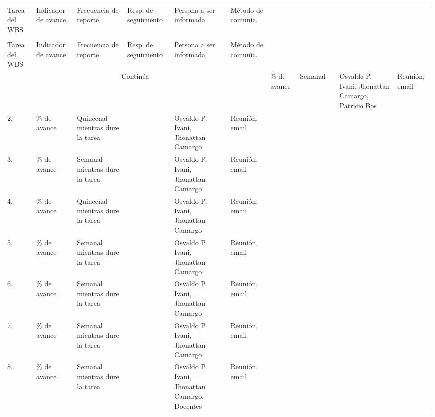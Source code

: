 \documentclass[11pt]{charter}
\begin{document}
\begin{longtable}{|m{1cm}|m{3.5cm}|m{2.2cm}|m{2cm}|m{3cm}|m{1.5cm}|}
\hline
\rowcolor[HTML]{C0C0C0} 
\multicolumn{6}{|c|}{\cellcolor[HTML]{C0C0C0}SEGUIMIENTO DE AVANCE}                                                                       \\ \hline
\rowcolor[HTML]{C0C0C0} 
Tarea del WBS 			& Indicador de avance & Frecuencia de reporte & Resp. de seguimiento & Persona a ser informada & Método de comunic. \\ \hline
\endfirsthead

\hline
\rowcolor[HTML]{C0C0C0} 
\multicolumn{6}{c}{\cellcolor[HTML]{C0C0C0}SEGUIMIENTO DE AVANCE}                                                                       \\ \hline
\rowcolor[HTML]{C0C0C0} 
Tarea del WBS 			& Indicador de avance & Frecuencia de reporte & Resp. de seguimiento & Persona a ser informada & Método de comunic. \\ \hline
\endhead

\multicolumn{6}{c}{Continúa}
\endfoot

\endlastfoot

1.	& \% de avance & Semanal & \authorname & Osvaldo P. Ivani, Jhonattan Camargo, Patricio Bos & Reunión, email \\ \hline
2.	& \% de avance & Quincenal mientras dure la tarea & \authorname & Osvaldo P. Ivani, Jhonattan Camargo & Reunión, email \\ \hline
3.	& \% de avance & Semanal mientras dure la tarea & \authorname & Osvaldo P. Ivani, Jhonattan Camargo & Reunión, email \\ \hline
4.	& \% de avance & Quincenal mientras dure la tarea & \authorname & Osvaldo P. Ivani, Jhonattan Camargo & Reunión, email \\ \hline
5.	& \% de avance  & Semanal mientras dure la tarea & \authorname & Osvaldo P. Ivani, Jhonattan Camargo & Reunión, email \\ \hline
6.	& \% de avance & Semanal mientras dure la tarea & \authorname & Osvaldo P. Ivani, Jhonattan Camargo & Reunión, email \\ \hline
7.	& \% de avance  & Semanal mientras dure la tarea & \authorname & Osvaldo P. Ivani, Jhonattan Camargo & Reunión, email \\ \hline
8.	& \% de avance  & Semanal mientras dure la tarea & \authorname & Osvaldo P. Ivani, Jhonattan Camargo, Docentes & Reunión, email \\ \hline
\end{longtable}
\end{document}
